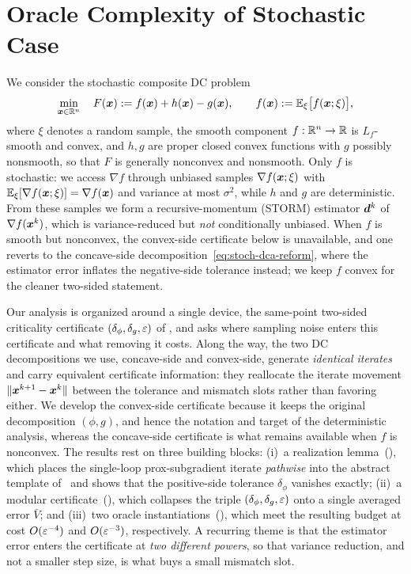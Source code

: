 \section{Oracle Complexity of Stochastic Case}
\label{subsec:stoch-ps-dca}

We consider the stochastic composite DC problem
\begin{equation}
    \min_{\bm{x}\in\mathbb{R}^n}\quad
    F(\bm{x}):=f(\bm{x})+h(\bm{x})-g(\bm{x}),
    \qquad
    f(\bm{x}):=\mathbb{E}_{\xi}\bigl[f(\bm{x};\xi)\bigr],
    \label{eq:stoch-composite-ps-dca-model}
\end{equation}
where $\xi$ denotes a random sample, the smooth component
$f:\mathbb{R}^n\to\mathbb{R}$ is $L_f$-smooth and convex, and $h,g$ are proper closed
convex functions with $g$ possibly nonsmooth, so that $F$ is generally
nonconvex and nonsmooth. Only $f$ is stochastic: we access $\nabla f$
through unbiased samples $\nabla f(\bm{x};\xi)$ with
$\mathbb{E}_\xi[\nabla f(\bm{x};\xi)]=\nabla f(\bm{x})$ and variance at most
$\sigma^2$, while $h$ and $g$ are deterministic. From these samples we
form a recursive-momentum (STORM) estimator $\bm{d}^k$ of $\nabla f(\bm{x}^k)$,
which is variance-reduced but \emph{not} conditionally unbiased. When $f$
is smooth but nonconvex, the convex-side certificate below is
unavailable, and one reverts to the concave-side
decomposition~\eqref{eq:stoch-dca-reform}, where the estimator error
inflates the negative-side tolerance instead; we keep $f$ convex for the
cleaner two-sided statement.

Our analysis is organized around a single device, the same-point
two-sided criticality certificate $(\delta_\phi,\delta_g,\varepsilon)$ of
, and asks where sampling noise enters this
certificate and what removing it costs. Along the way, the two DC
decompositions we use, concave-side and convex-side, generate
\emph{identical iterates} and carry equivalent certificate information:
they reallocate the iterate movement $\lVert \bm{x}^{k+1}-\bm{x}^k\rVert$ between the
tolerance and mismatch slots rather than favoring either. We develop the
convex-side certificate because it keeps the original decomposition
$(\phi,g)$, and hence the notation and target of the deterministic
analysis, whereas the concave-side certificate is what remains available
when $f$ is nonconvex. The results rest on three building blocks:
(i)~a realization lemma~(), which
places the single-loop prox-subgradient iterate \emph{pathwise} into the
abstract template of~ and shows that the
positive-side tolerance $\delta_\phi$ vanishes exactly;
(ii)~a modular certificate~(), which
collapses the triple $(\delta_\phi,\delta_g,\varepsilon)$ onto a single averaged
error $\bar V$; and (iii)~two oracle
instantiations~(), which meet
the resulting budget at cost $O(\varepsilon^{-4})$ and $O(\varepsilon^{-3})$,
respectively. A recurring theme is that the estimator error enters the
certificate at \emph{two different powers}, so that variance reduction,
and not a smaller step size, is what buys a small mismatch slot.

